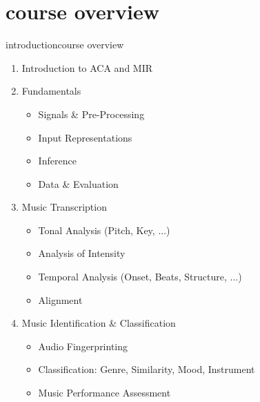     \section[course overview]{course overview}
        \begin{frame}{introduction}{course overview}
            \begin{enumerate}
                \item   Introduction to ACA and MIR
                \item   Fundamentals
                    \begin{itemize}
                        \item   Signals \& Pre-Processing
                        \item   Input Representations
                        \item   Inference
                        \item   Data \& Evaluation
                    \end{itemize}
                \item   Music Transcription
                    \begin{itemize}
                        \item   Tonal Analysis (Pitch, Key, ...)
                        \item   Analysis of Intensity
                        \item   Temporal Analysis (Onset, Beats, Structure, ...)
                        \item   Alignment
                    \end{itemize}
                \item   Music Identification \& Classification
                    \begin{itemize}
                        \item    Audio Fingerprinting
                        \item   Classification: Genre, Similarity, Mood, Instrument
                        \item   Music Performance Assessment
                    \end{itemize}
            \end{enumerate}
        \end{frame}
        
